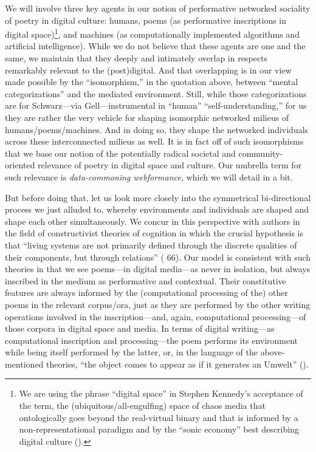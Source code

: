 We will involve three key agents in our notion of performative networked
sociality of poetry in digital culture: humans, poems (as performative
inscriptions in digital space)\footnote{We are using the phrase
  ``digital space'' in Stephen Kennedy's acceptance of the term, the
  (ubiquitous/all-engulfing) space of chaos media that ontologically
  goes beyond the real-virtual binary and that is informed by a
  non-representational paradigm and by the ``sonic economy'' best
  describing digital culture (\cite{kennedy2015chaos}).}, and machines
(as computationally implemented algorithms and artificial intelligence).
While we do not believe that these agents are one and the same, we
maintain that they deeply and intimately overlap in respects remarkably
relevant to the (post)digital. And that overlapping is in our view made
possible by the ``isomorphism,'' in the quotation above, between
``mental categorizations'' and the mediated environment. Still, while
those categorizations are for Schwarz---via Gell---instrumental in
``human'' ``self-understanding,'' for us they are rather the very
vehicle for shaping isomorphic networked milieus of
humans/poems/machines. And in doing so, they shape the networked
individuals across these interconnected milieus as well. It is in fact
off of such isomorphisms that we base our notion of the potentially
radical societal and community-oriented relevance of poetry in digital
space and culture. Our umbrella term for such relevance is
\emph{data-commoning webformance,} which we will detail in a bit.

But before doing that, let us look more closely into the symmetrical
bi-directional process we just alluded to, whereby environments and
individuals are shaped and shape each other simultaneously. We concur in
this perspective with authors in the field of constructivist theories of
cognition in which the crucial hypothesis is that ``living systems are
not primarily defined through the discrete qualities of their
components, but through relations'' (\cite{schwarz2018umwelt} 66). Our
model is consistent with such theories in that we see poems---in digital
media---as never in isolation, but always inscribed in the medium as
performative and contextual. Their constitutive features are always
informed by the (computational processing of the) other poems in the
relevant corpus/ora, just as they are performed by the other writing
operations involved in the inscription---and, again, computational
processing---of those corpora in digital space and media. In terms of
digital writing---as computational inscription and processing---the poem
performs its environment while being itself performed by the latter, or,
in the language of the above-mentioned theories, ``the object comes to
appear as if it generates an Umwelt'' (\cite{schwarz2018umwelt}).

